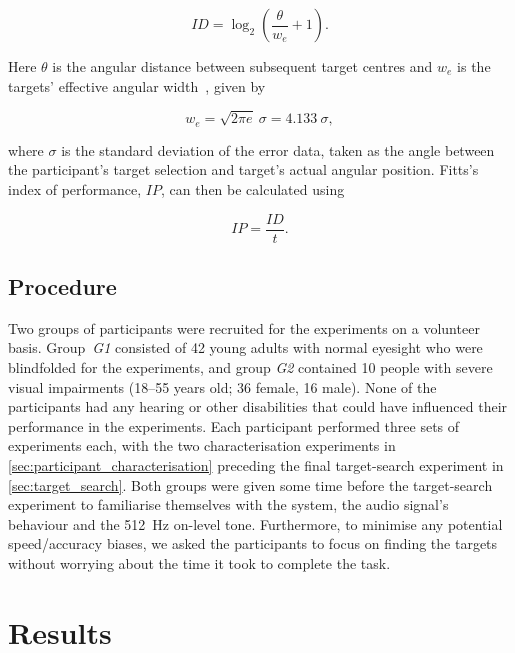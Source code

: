 \documentclass[acmsmall]{acmart}
\begin{document}
\begin{equation}
  \label{eq:fitts-id}
  ID = \log_2\left(\frac{\theta}{w_e} + 1\right).
\end{equation}

\noindent
Here $\theta$ is the angular distance between subsequent target centres and $w_e$ is the targets' effective angular width~\citep{welford1968fundamentals}, given by

\begin{equation}
  \label{eq:fitts-we}
  w_e = \sqrt{2\pi e}~\sigma = 4.133~\sigma,
\end{equation}

\noindent
where $\sigma$ is the standard deviation of the error data, taken as the angle between the participant's target selection and target's actual angular position.
Fitts's index of performance, $IP$, can then be calculated using 

\begin{equation}
  \label{eq:fitts-performance}
  IP = \frac{ID}{t}.
\end{equation}

\subsection{Procedure}

Two groups of participants were recruited for the experiments on a volunteer basis. 
Group~\textit{G1} consisted of 42 young adults with normal eyesight who were blindfolded for the experiments, and group \textit{G2} contained 10 people with severe visual impairments (18--55 years old; 36 female, 16 male). 
None of the participants had any hearing or other disabilities that could have influenced their performance in the experiments.
Each participant performed three sets of experiments each, with the two characterisation experiments in \cref{sec:participant_characterisation} preceding the final target-search experiment in \cref{sec:target_search}. 
Both groups were given some time before the target-search experiment to familiarise themselves with the system, the audio signal's behaviour and the \SI{512}{\hertz} on-level tone. 
Furthermore, to minimise any potential speed/accuracy biases, we asked the participants to focus on finding the targets without worrying about the time it took to complete the task. 

\section{Results}\label{sec:results}
\end{document}
